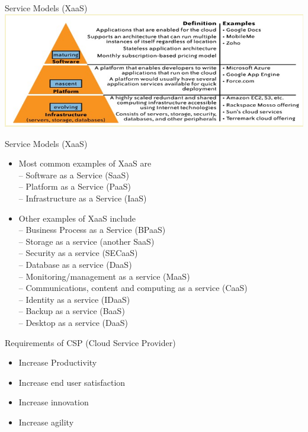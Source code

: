 \documentclass{SKP-beamer}
\begin{document}
\begin{frame}{Service Models (XaaS)}
	\includegraphics[scale=0.6]{l.png}
\end{frame}

\begin{frame}{Service Models (XaaS)}
	\begin{itemize}
		\item Most common examples of XaaS are \\
		-- Software as a Service (SaaS) \\
		-- Platform as a Service (PaaS) \\
		-- Infrastructure as a Service (IaaS) \\
		
		\item Other examples of XaaS include \\
		-- Business Process as a Service (BPaaS) \\
		-- Storage as a service (another SaaS) \\
		-- Security as a service (SECaaS) \\
		-- Database as a service (DaaS) \\
		-- Monitoring/management as a service (MaaS) \\
		-- Communications, content and computing as a service (CaaS) \\
		-- Identity as a service (IDaaS) \\
		-- Backup as a service (BaaS) \\
		-- Desktop as a service (DaaS) 
		
		
	\end{itemize}
\end{frame}

\begin{frame}{Requirements of CSP (Cloud Service Provider)}
	\begin{itemize}
		\item Increase Productivity
		\item Increase end user satisfaction
		\item Increase innovation
		\item Increase agility

	\end{itemize}
\end{frame} 
\end{document}
